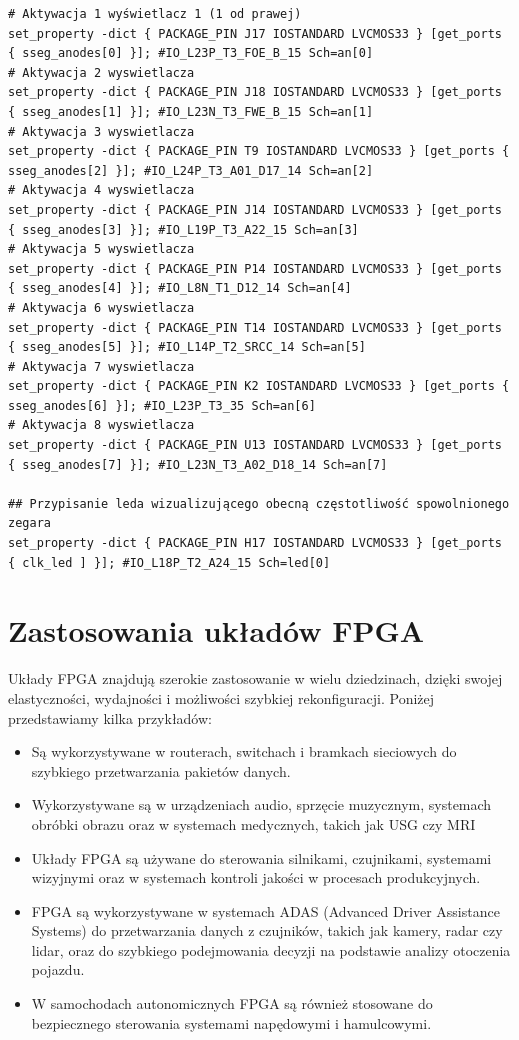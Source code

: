 \documentclass[a4paper]{article}
\begin{document}
\begin{verbatim}
# Aktywacja 1 wyświetlacz 1 (1 od prawej)
set_property -dict { PACKAGE_PIN J17 IOSTANDARD LVCMOS33 } [get_ports { sseg_anodes[0] }]; #IO_L23P_T3_FOE_B_15 Sch=an[0]
# Aktywacja 2 wyswietlacza 
set_property -dict { PACKAGE_PIN J18 IOSTANDARD LVCMOS33 } [get_ports { sseg_anodes[1] }]; #IO_L23N_T3_FWE_B_15 Sch=an[1]
# Aktywacja 3 wyswietlacza 
set_property -dict { PACKAGE_PIN T9 IOSTANDARD LVCMOS33 } [get_ports { sseg_anodes[2] }]; #IO_L24P_T3_A01_D17_14 Sch=an[2]
# Aktywacja 4 wyswietlacza 
set_property -dict { PACKAGE_PIN J14 IOSTANDARD LVCMOS33 } [get_ports { sseg_anodes[3] }]; #IO_L19P_T3_A22_15 Sch=an[3]
# Aktywacja 5 wyswietlacza 
set_property -dict { PACKAGE_PIN P14 IOSTANDARD LVCMOS33 } [get_ports { sseg_anodes[4] }]; #IO_L8N_T1_D12_14 Sch=an[4]
# Aktywacja 6 wyswietlacza 
set_property -dict { PACKAGE_PIN T14 IOSTANDARD LVCMOS33 } [get_ports { sseg_anodes[5] }]; #IO_L14P_T2_SRCC_14 Sch=an[5]
# Aktywacja 7 wyswietlacza 
set_property -dict { PACKAGE_PIN K2 IOSTANDARD LVCMOS33 } [get_ports { sseg_anodes[6] }]; #IO_L23P_T3_35 Sch=an[6]
# Aktywacja 8 wyswietlacza 
set_property -dict { PACKAGE_PIN U13 IOSTANDARD LVCMOS33 } [get_ports { sseg_anodes[7] }]; #IO_L23N_T3_A02_D18_14 Sch=an[7]

## Przypisanie leda wizualizującego obecną częstotliwość spowolnionego zegara
set_property -dict { PACKAGE_PIN H17 IOSTANDARD LVCMOS33 } [get_ports { clk_led ] }]; #IO_L18P_T2_A24_15 Sch=led[0]

\end{verbatim}

\section{Zastosowania układów FPGA}
Układy FPGA znajdują szerokie zastosowanie w wielu dziedzinach,
dzięki swojej elastyczności, wydajności i możliwości szybkiej rekonfiguracji.
Poniżej przedstawiamy kilka przykładów:

\begin{itemize}
    \item Są wykorzystywane w routerach, switchach i bramkach sieciowych do szybkiego przetwarzania pakietów danych.
    \item Wykorzystywane są w urządzeniach audio, sprzęcie muzycznym, systemach obróbki obrazu oraz w systemach medycznych, takich jak USG czy MRI
    \item Układy FPGA są używane do sterowania silnikami, czujnikami, systemami wizyjnymi oraz w systemach kontroli jakości w procesach produkcyjnych.
    \item FPGA są wykorzystywane w systemach ADAS (Advanced Driver Assistance Systems) do przetwarzania danych z czujników, takich jak kamery, radar czy lidar, 
    oraz do szybkiego podejmowania decyzji na podstawie analizy otoczenia pojazdu.
    \item W samochodach autonomicznych FPGA są również stosowane do bezpiecznego sterowania systemami napędowymi i hamulcowymi.
\end{itemize}
\end{document}
